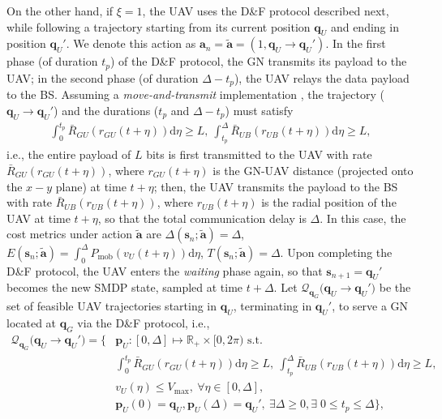 \documentclass[12pt, draftcls, onecolumn]{IEEEtran}
\theoremstyle{plain}
\theoremstyle{definition}
\theoremstyle{remark}
\begin{document}
On the other hand, if $\xi{=}1$, the UAV uses the D\&F protocol described next, while following a trajectory starting from its current position $\mathbf{q}_{U}$ and ending in position $\mathbf{q}_{U}'$. We denote this action as $\mathbf{a}_{n}{=}\mathbf{\tilde{a}}{=}(1,\mathbf{q}_{U}{\rightarrow}{\mathbf{q}}_{U}')$. In the first phase (of duration $t_{p}$) of the D\&F protocol, the GN transmits its payload to the UAV; in the second phase (of duration $\Delta{-}t_{p}$), the UAV relays the data payload to the BS. Assuming a \emph{move-and-transmit} implementation \cite{SCA}, the trajectory ($\mathbf{q}_{U}{\rightarrow}{\mathbf{q}}_{U}'$) and the durations ($t_{p}$ and $\Delta{-}t_{p}$) must satisfy
\begin{align}\label{eq:PLConst0}
	\int_{0}^{t_{p}} \bar{R}_{GU}(r_{GU}(t+\eta)) \mathrm d \eta \geq L, \ \int_{t_p}^{\Delta} \bar R_{UB}(r_{UB}(t+\eta)) \mathrm d \eta \geq L,
\end{align}
i.e., the entire payload of $L$ bits is first transmitted to the UAV with rate $\bar R_{GU}(r_{GU}(t{+}\eta))$, where $r_{GU}(t{+}{\eta})$ is the GN-UAV distance (projected onto the $x{-}y$ plane) at time $t{+}\eta$; then, the UAV transmits the payload to the BS with rate $\bar{R}_{UB}(r_{UB}(t{+}\eta))$, where $r_{UB}(t{+}\eta)$ is the radial position of the UAV at time $t{+}\eta$, so that the total communication delay is $\Delta$.  In this case, the cost metrics under action $\mathbf{\tilde{a}}$ are $\Delta(\mathbf{s}_{n};\mathbf{\tilde{a}}){=}\Delta$, $E(\mathbf{s}_{n};\mathbf{\tilde{a}}){=}\int_0^\Delta P_{\mathrm{mob}}\left(v_{U}(t{+}\eta)\right)\mathrm{d}\eta$, $T(\mathbf{s}_{n};\mathbf{\tilde{a}}){=}\Delta$. Upon completing the D\&F protocol, the UAV enters the \emph{waiting} phase again, so that $\mathbf{s}_{n{+}1}{=}\mathbf{q}_{U}'$ becomes the new SMDP state, sampled at time $t{+}\Delta$. Let $\mathcal{Q}_{\mathbf{q}_{G}}\big(\mathbf{q}_{U}{\rightarrow}{\mathbf{q}}_{U}'\big)$ be the set of feasible UAV trajectories starting in $\mathbf{q}_{U}$, terminating in $\mathbf{q}_{U}'$, to serve a GN located at $\mathbf{q}_{G}$ via the D\&F protocol, i.e.,
\begin{align}
	\mathcal{Q}_{\mathbf q_G} \big({\mathbf q}_U\rightarrow{\mathbf q}_U'\big) = \Big\{ &\mathbf{p}_{U} : 
	[0,\Delta] \mapsto \mathbb{R}_{+} \times[0,2\pi)\text{ s.t.}\\
	&\int_{0}^{t_{p}} \bar{R}_{GU}(r_{GU}(t+\eta)) \mathrm d \eta \geq L, \ \int_{t_p}^{\Delta} \bar R_{UB}(r_{UB}(t+\eta)) \mathrm d \eta \geq L, \label{eq:PLConst1}\tag{C.1}\\
	&v_U (\eta) \leq V_{\mathrm{max}},\ \forall\eta\in[0,\Delta],\label{eq:SpeedConst1}\tag{C.2}\\
	&\mathbf{p}_{U}(0) ={\mathbf q}_U, 
	\mathbf{p}_{U}(\Delta) ={\mathbf q}_U',\label{eq:IFConst1}\ \exists \Delta \geq 0, \exists\; 0 \leq t_p \leq \Delta 
	\Big\},
	\tag{C.3}
\end{align}
\end{document}
